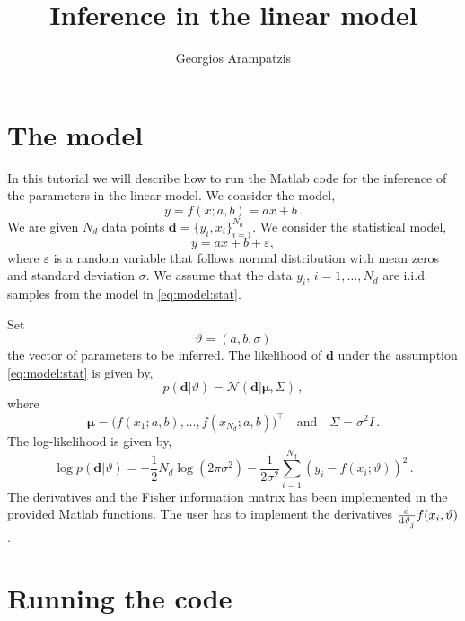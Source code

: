 \documentclass{article}
\title{Inference in the linear model}
\author{Georgios Arampatzis}
\begin{document}
\maketitle


\section{The model}
In this tutorial we will describe how to run the Matlab code for the inference of the parameters in the linear model. We consider the model,
%
\begin{equation}
y = f(x;a,b) = ax + b \, .
\end{equation}
%
We are given $N_d$ data points $\bm{d} = \{y_i,x_i\}_{i=1}^{N_d}$. We consider the statistical model,
%
\begin{equation} \label{eq:model:stat}
y = ax+b + \varepsilon,
\end{equation}
%
where $\varepsilon$ is a random variable that follows normal distribution with mean zeros and standard deviation $\sigma$. We assume that the data $y_i,\, i=1,\ldots,N_d$ are i.i.d samples from the model in \cref{eq:model:stat}.

Set 
%
$$\vartheta=(a,b,\sigma)$$ 
%
the vector of parameters to be inferred. The likelihood of $\bm{d}$ under the assumption  \cref{eq:model:stat} is given by,
%
\begin{equation}
p(\bm{d} | \vartheta) = \mathcal{N} \left( \bm{d} | \bm {\mu}, \Sigma   \right) \, ,
\end{equation}
%
where
%
\begin{equation}
\bm{\mu} = \big(  f(x_1;a,b),\ldots, f(x_{N_d};a,b)  \big)^\top \quad  \mathrm{ and } \quad \Sigma=\sigma^2 I \, .
\end{equation}
%
The log-likelihood is given by,
%
\begin{equation} \label{eq:loglikelihood}
\log p(\bm{d} | \vartheta) = -\frac{1}{2} N_d   \log(2\pi \sigma^2)  -\frac{1}{2 \sigma^2}\sum_{i=1}^{N_d} (y_i - f(x_i;\vartheta))^2 \,.
\end{equation}
%
The derivatives and the Fisher information matrix has been implemented in the provided Matlab functions. The user has to implement the derivatives $\od{}{\vartheta_j}f(x_i,\vartheta)$. 





\section{Running the code}
\end{document}
